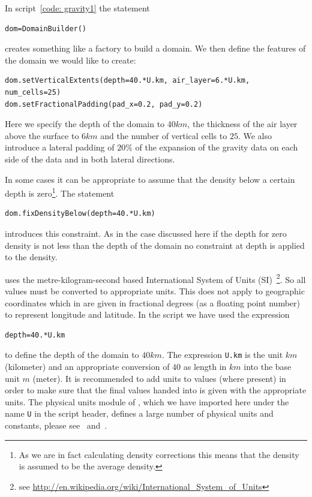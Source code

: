 In script~\ref{code: gravity1} the statement
\begin{verbatim}
dom=DomainBuilder()
\end{verbatim}
creates something like a factory to build a domain.
We then define the features of the domain we would like to create:
\begin{verbatim}
dom.setVerticalExtents(depth=40.*U.km, air_layer=6.*U.km, num_cells=25)
dom.setFractionalPadding(pad_x=0.2, pad_y=0.2)
\end{verbatim}
Here we specify the depth of the domain to $40 km$, the thickness of the air
layer above the surface to $6 km$ and the number of vertical cells to $25$.
We also introduce a lateral padding of $20 \%$ of the expansion of the gravity
data on each side of the data and in both lateral directions.

In some cases it can be appropriate to assume that the density below a certain
depth is zero\footnote{As we are in fact calculating density corrections this
means that the density is assumed to be the average density.}.
The statement 
\begin{verbatim}
dom.fixDensityBelow(depth=40.*U.km)
\end{verbatim}
introduces this constraint.
As in the case discussed here if the depth for zero density is not less than
the depth of the domain no constraint at depth is applied to the density.

\downunder uses the metre-kilogram-second based International System of Units
(SI)~\footnote{see \url{http://en.wikipedia.org/wiki/International_System_of_Units}}.
So all values must be converted to appropriate units.
This does not apply to geographic coordinates which in \downunder are given in
fractional degrees (as a floating point number) to represent longitude and
latitude. In the script we have used the expression
\begin{verbatim}
depth=40.*U.km
\end{verbatim}
to define the depth of the domain to $40 km$.
The expression \verb|U.km| is the unit $km$ (kilometer) and an appropriate
conversion of $40$ as length in $km$ into the base unit $m$ (meter).
It is recommended to add units to values (where present) in order to make sure
that the final values handed into \downunder is given with the appropriate
units.
The physical units module of \escript, which we have imported here under the
name \verb|U| in the script header, defines a large number of physical units
and constants, please see~\cite{ESCRIPT} and~\cite{ESCRIPTONLINE}. 

